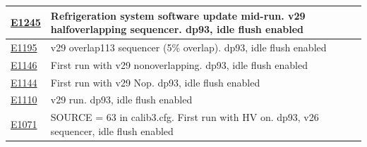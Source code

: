 \begin{longtable}{|p{5.0cm}|p{8.5cm}|}
\href{https://s3df.slac.stanford.edu/data/rubin/lsstcam/E1245/w_2024_35/}{E1245} & Refrigeration system software update mid-run. v29 halfoverlapping sequencer. dp93, idle flush enabled \\ \hline
\href{https://s3df.slac.stanford.edu/data/rubin/lsstcam/E1195/w_2024_35/}{E1195} & v29 overlap113 sequencer (5\% overlap). dp93, idle flush enabled \\ \hline
\href{https://s3df.slac.stanford.edu/data/rubin/lsstcam/E1146/w_2024_35/}{E1146} & First run with v29 nonoverlapping. dp93, idle flush enabled \\ \hline
\href{https://s3df.slac.stanford.edu/data/rubin/lsstcam/E1144/w_2024_35/}{E1144} & First run with v29 Nop. dp93, idle flush enabled \\ \hline
\href{https://s3df.slac.stanford.edu/data/rubin/lsstcam/E1110/w_2024_35/}{E1110} & v29 run. dp93, idle flush enabled \\ \hline
\href{https://s3df.slac.stanford.edu/data/rubin/lsstcam/E1071/w_2024_35/}{E1071} & SOURCE = 63 in calib3.cfg. First run with HV on. dp93, v26 sequencer, idle flush enabled \\ \hline

\end{longtable}


